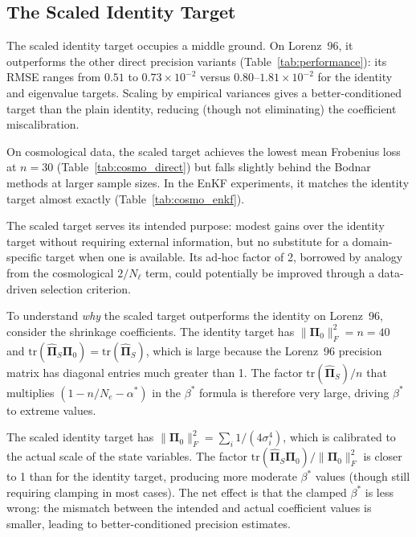 \subsection{The Scaled Identity Target}
\label{sec:scaled_results}

The scaled identity target occupies a middle ground. On Lorenz~96, it outperforms the other direct precision variants (Table~\ref{tab:performance}): its RMSE ranges from $0.51$ to $0.73 \times 10^{-2}$ versus $0.80$--$1.81 \times 10^{-2}$ for the identity and eigenvalue targets. Scaling by empirical variances gives a better-conditioned target than the plain identity, reducing (though not eliminating) the coefficient miscalibration.

On cosmological data, the scaled target achieves the lowest mean Frobenius loss at $n = 30$ (Table~\ref{tab:cosmo_direct}) but falls slightly behind the Bodnar methods at larger sample sizes. In the EnKF experiments, it matches the identity target almost exactly (Table~\ref{tab:cosmo_enkf}).

The scaled target serves its intended purpose: modest gains over the identity target without requiring external information, but no substitute for a domain-specific target when one is available. Its ad-hoc factor of 2, borrowed by analogy from the cosmological $2/N_\ell$ term, could potentially be improved through a data-driven selection criterion.

To understand \emph{why} the scaled target outperforms the identity on Lorenz~96, consider the shrinkage coefficients. The identity target has $\|\boldsymbol{\Pi}_0\|_F^2 = n = 40$ and $\text{tr}(\hat{\boldsymbol{\Pi}}_S \boldsymbol{\Pi}_0) = \text{tr}(\hat{\boldsymbol{\Pi}}_S)$, which is large because the Lorenz~96 precision matrix has diagonal entries much greater than 1. The factor $\text{tr}(\hat{\boldsymbol{\Pi}}_S)/n$ that multiplies $(1 - n/N_e - \alpha^*)$ in the $\beta^*$ formula is therefore very large, driving $\beta^*$ to extreme values.

The scaled identity target has $\|\boldsymbol{\Pi}_0\|_F^2 = \sum_i 1/(4\sigma_i^4)$, which is calibrated to the actual scale of the state variables. The factor $\text{tr}(\hat{\boldsymbol{\Pi}}_S \boldsymbol{\Pi}_0)/\|\boldsymbol{\Pi}_0\|_F^2$ is closer to 1 than for the identity target, producing more moderate $\beta^*$ values (though still requiring clamping in most cases). The net effect is that the clamped $\beta^*$ is less wrong: the mismatch between the intended and actual coefficient values is smaller, leading to better-conditioned precision estimates.

